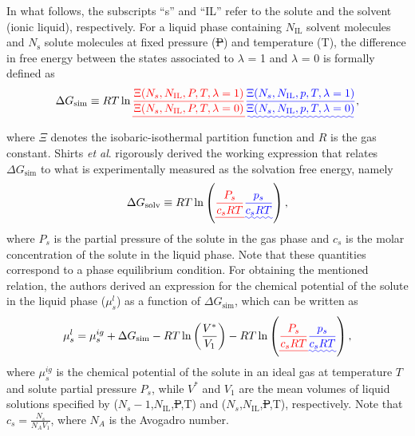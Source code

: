 \documentclass[3p,twocolumn]{elsarticle}
\providecommand{\DIFadd}[1]{{\protect\color{blue}\uwave{#1}}} %
\providecommand{\DIFdel}[1]{{\protect\color{red}\sout{#1}}}                      %
\providecommand{\DIFaddbegin}{} %
\providecommand{\DIFaddend}{} %
\providecommand{\DIFdelbegin}{} %
\providecommand{\DIFdelend}{} %
\newcommand{\DIFscaledelfig}{0.5}
\newlength{\DIFdelgraphicswidth} %
\newlength{\DIFdelgraphicsheight} %
\newcommand{\DIFaddincludegraphics}[2][]{{\color{blue}\fbox{\DIFOincludegraphics[#1]{#2}}}} %
\newcommand{\DIFdelincludegraphics}[2][]{%
\sbox{\DIFdelgraphicsbox}{\DIFOincludegraphics[#1]{#2}}%
\settoboxwidth{\DIFdelgraphicswidth}{\DIFdelgraphicsbox} %
\settoboxtotalheight{\DIFdelgraphicsheight}{\DIFdelgraphicsbox} %
\scalebox{\DIFscaledelfig}{%
\parbox[b]{\DIFdelgraphicswidth}{\usebox{\DIFdelgraphicsbox}\\[-\baselineskip] \rule{\DIFdelgraphicswidth}{0em}}\llap{\resizebox{\DIFdelgraphicswidth}{\DIFdelgraphicsheight}{%
\setlength{\unitlength}{\DIFdelgraphicswidth}%
\begin{picture}(1,1)%
\thicklines\linethickness{2pt} %
{\color[rgb]{1,0,0}\put(0,0){\framebox(1,1){}}}%
{\color[rgb]{1,0,0}\put(0,0){\line( 1,1){1}}}%
{\color[rgb]{1,0,0}\put(0,1){\line(1,-1){1}}}%
\end{picture}%
}\hspace*{3pt}}} %
} %
\DeclareRobustCommand{\DIFaddbegin}{\DIFOaddbegin \let\includegraphics\DIFaddincludegraphics} %
\DeclareRobustCommand{\DIFaddend}{\DIFOaddend \let\includegraphics\DIFOincludegraphics} %
\DeclareRobustCommand{\DIFdelbegin}{\DIFOdelbegin \let\includegraphics\DIFdelincludegraphics} %
\DeclareRobustCommand{\DIFdelend}{\DIFOaddend \let\includegraphics\DIFOincludegraphics} %
\begin{document}
In what follows, the subscripts ``s'' and ``IL'' refer to the solute and the solvent (ionic liquid), respectively.
For a liquid phase containing $N_\text{IL}$ solvent molecules and $N_{\text{s}}$ solute molecules at fixed pressure (\DIFdelbegin \DIFdel{P}\DIFdelend \DIFaddbegin \DIFadd{p}\DIFaddend ) and temperature (T), the difference in free energy between the states associated to $\lambda$ = 1 and $\lambda$ = 0 is formally defined as
\begin{equation}
\Delta G_\text{sim} \equiv R T \ln \DIFdelbegin \DIFdel{\frac{\Xi (N_s,N_\text{IL},P,T,\lambda = 1)}{\Xi (N_s,N_\text{IL},P,T,\lambda = 0)}}\DIFdelend \DIFaddbegin \DIFadd{\frac{\Xi (N_s,N_\text{IL},p,T,\lambda = 1)}{\Xi (N_s,N_\text{IL},p,T,\lambda = 0)}}\DIFaddend , 
\end{equation}
where $\Xi$ denotes the isobaric-isothermal partition function and $R$ is the gas constant.
Shirts \textit{et al}. \cite{Shirts_2003} rigorously derived the working expression that relates $\Delta G_\text{sim}$ to what is experimentally measured as the solvation free energy, namely
\begin{equation}
\label{eq:solvation free energy definition}
\Delta G_{\text{solv}} \equiv R T \ln \left( \DIFdelbegin \DIFdel{\frac{P_s}{c_s R T} }\DIFdelend \DIFaddbegin \DIFadd{\frac{p_s}{c_s R T} }\DIFaddend \right),
\end{equation}
where \DIFdelbegin \DIFdel{$P_s$ }\DIFdelend \DIFaddbegin \DIFadd{$p_s$ }\DIFaddend is the partial pressure of the solute in the gas phase and
$c_s$ is the molar concentration of the solute in the liquid phase.
Note that these quantities correspond to a phase equilibrium condition.
For obtaining the mentioned relation, the authors derived an expression for the chemical potential of the solute in the liquid phase ($\mu^l_s$) as a function of $\Delta G_\text{sim}$, which can be written as
\begin{equation}
\label{eq:solute chemical potential}
\mu^l_s = \mu^{ig}_s + \Delta G_\text{sim} - RT \ln \left( \frac{V^{\ast}}{V_1}\right) - RT \ln \left( \DIFdelbegin \DIFdel{\frac{P_s}{c_s R T} }\DIFdelend \DIFaddbegin \DIFadd{\frac{p_s}{c_s R T} }\DIFaddend \right),
\end{equation}
where $\mu^{ig}_s$ is the chemical potential of the solute in an ideal gas at temperature $T$ and solute partial pressure \DIFdelbegin \DIFdel{$P_s$}\DIFdelend \DIFaddbegin \DIFadd{$p_s$}\DIFaddend , while $V^{\ast}$ and $V_1$ are the mean volumes of liquid solutions specified by ($N_s-1$,$N_\text{IL}$,\DIFdelbegin \DIFdel{P}\DIFdelend \DIFaddbegin \DIFadd{p}\DIFaddend ,T) and ($N_s$,$N_\text{IL}$,\DIFdelbegin \DIFdel{P}\DIFdelend \DIFaddbegin \DIFadd{p}\DIFaddend ,T), respectively.
Note that $c_s = \frac{N_s}{N_A V_1}$, where $N_A$ is the Avogadro number.
\end{document}
